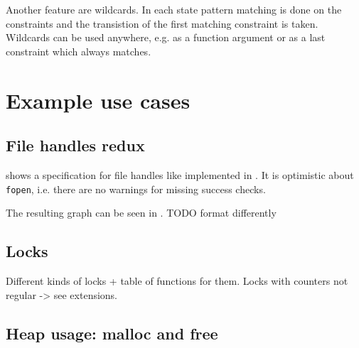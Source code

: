 Another feature are wildcards. In each state pattern matching is done on the constraints and the transistion of the first matching constraint is taken. Wildcards can be used anywhere, e.g. as a function argument or as a last constraint which always matches.



\chapter{Example use cases}

\section{File handles redux}
 shows a specification for file handles like implemented in . It is optimistic about \verb|fopen|, i.e. there are no warnings for missing success checks.

The resulting graph can be seen in . %
TODO format differently
\begin{landscape}
\end{landscape}


\section{Locks}
Different kinds of locks + table of functions for them.
Locks with counters not regular -> see extensions.


\section{Heap usage: malloc and free}





